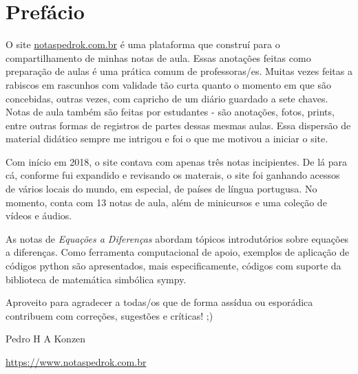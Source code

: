 

\chapter*{Prefácio}\label{prefacio}

O site \href{https://www.notaspedrok.com.br}{notaspedrok.com.br} é uma plataforma que construí para o compartilhamento de minhas notas de aula. Essas anotações feitas como preparação de aulas é uma prática comum de professoras/es. Muitas vezes feitas a rabiscos em rascunhos com validade tão curta quanto o momento em que são concebidas, outras vezes, com capricho de um diário guardado a sete chaves. Notas de aula também são feitas por estudantes - são anotações, fotos, prints, entre outras formas de registros de partes dessas mesmas aulas. Essa dispersão de material didático sempre me intrigou e foi o que me motivou a iniciar o site.

Com início em 2018, o site contava com apenas três notas incipientes. De lá para cá, conforme fui expandido e revisando os materais, o site foi ganhando acessos de vários locais do mundo, em especial, de países de língua portugusa. No momento, conta com 13 notas de aula, além de minicursos e uma coleção de vídeos e áudios.

As notas de \emph{Equações a Diferenças} abordam tópicos introdutórios sobre equações a diferenças. Como ferramenta computacional de apoio, exemplos de aplicação de códigos {python} são apresentados, mais especificamente, códigos com suporte da biblioteca de matemática simbólica {sympy}.

Aproveito para agradecer a todas/os que de forma assídua ou esporádica contribuem com correções, sugestões e críticas! ;)

\begin{flushright}
  Pedro H A Konzen

  \url{https://www.notaspedrok.com.br}
\end{flushright}
